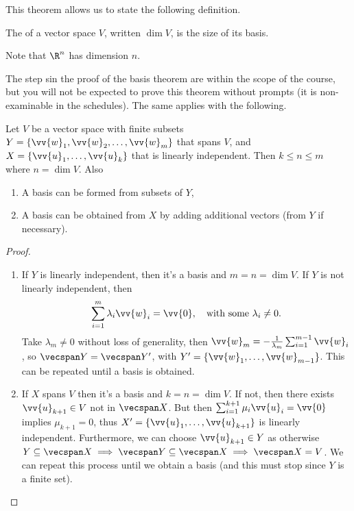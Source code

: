 This theorem allows us to state the following definition.

\begin{definition}[Definition]
    The  of a vector space $V$, written $\operatorname{dim} V$, is the size of its basis.
\end{definition}

Note that $\R^n$ has dimension $n$.

The step sin the proof of the basis theorem are within the scope of the course, but you will not be expected to prove this theorem without prompts (it is non-examinable in the schedules). The same applies with the following.


\begin{proposition}
    Let $V$ be a vector space with finite subsets $Y = \{\vv{w}_1, \vv{w}_2, \dots, \vv{w}_m\}$ that spans $V$, and $X = \{\vv{u}_1, \dots, \vv{u}_k \}$ that is linearly independent. Then $k \leq n \leq m$ where $n = \operatorname{dim} V$. Also
    \begin{enumerate}[label=(\roman*)]
        \item A basis can be formed from subsets of $Y$,
        \item A basis can be obtained from $X$ by adding additional vectors (from $Y$ if necessary).
    \end{enumerate}
\end{proposition}
\begin{proof}
    \begin{enumerate}[label=(\roman*)]
        \item If $Y$ is linearly independent, then it's a basis and $m = n = \operatorname{dim} V$. If $Y$ is not linearly independent, then
        $$
        \sum_{i = 1}^m \lambda_i \vv{w}_i = \vv{0}, \quad \text{with some } \lambda_i \neq 0.
        $$
        Take $\lambda_m \neq 0$ without loss of generality, then $\vv{w}_m = -\frac{1}{\lambda_m} \sum_{i = 1}^{m - 1} \vv{w}_i$,
        so $\vecspan Y = \vecspan Y'$, with $Y' = \{\vv{w}_1, \dots, \vv{w}_{m - 1}\}$. This can be repeated until a basis is obtained.
        \item If $X$ spans $V$ then it's a basis and $k = n = \operatorname{dim} V$. If not, then there exists $\vv{u}_{k + 1} \in V$ not in $\vecspan X$. But then $\sum_{i = 1}^{k + 1} \mu_i \vv{u}_i = \vv{0}$ implies $\mu_{k + 1} = 0$, thus $X' = \{\vv{u}_1, \dots, \vv{u}_{k + 1} \}$ is linearly independent. Furthermore, we can choose $\vv{u}_{k + 1} \in Y$ as otherwise $Y \subseteq \vecspan X \implies \vecspan Y \subseteq \vecspan X \implies \vecspan X = V$.
        We can repeat this process until we obtain a basis (and this must stop since $Y$ is a finite set).   \qedhere
    \end{enumerate}
\end{proof}

